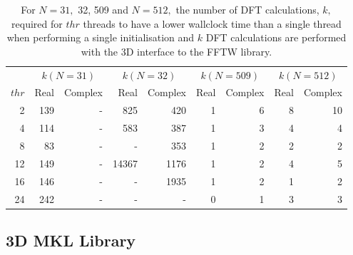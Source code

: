 \documentclass[a4paper]{article}
\begin{document}
\begin{table}
\begin{center}
\begin{tabular}{|r||r|r||r|r||r|r||r|r|}
  \hline
 & \multicolumn{2}{|c||}{$k(N=31)$} & \multicolumn{2}{|c||}{$k(N=32)$} & \multicolumn{2}{|c||}{$k(N=509)$} & \multicolumn{2}{|c|}{$k(N=512)$} \\
$thr$ &  Real & Complex &  Real & Complex &  Real & Complex &  Real & Complex \\ \hline
  2 & 139  & -  &  825  & 420  & 1 &  6   & 8  & 10 \\
  4 & 114  & -  &  583  & 387  & 1 &  3   & 4  & 4  \\
  8 & 83   & -  &  -    & 353  & 1 &  2   & 2  & 2  \\
  12 & 149 & -  & 14367 & 1176 & 1 &  2   & 4  & 5  \\
  16 & 146 & -  &  -    & 1935 & 1 &  2   & 1  & 2  \\
  24 & 242 & -  &  -    &  -   & 0 &  1   & 3  & 3  \\ \hline
\end{tabular}
\caption{ For $N=31,$ 32, 509 and $N=512,$ the number of DFT calculations, $k,$ required for $thr$ threads to have a lower wallclock time than a single thread when performing  a single initialisation and $k$ DFT calculations are performed with the 3D interface to the FFTW library.  }\label{Tbl:FFTW3dk}
\end{center}
\end{table}


\subsection{3D MKL Library}\label{Sec:3DMKL}
\end{document}
